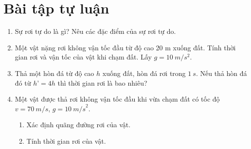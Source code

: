 \section{Bài tập tự luận}
\begin{enumerate}[label=\bfseries Bài \arabic*:,leftmargin=1.5cm]
	\item {}
	
	{
		Sự rơi tự do là gì? Nêu các đặc điểm của sự rơi tự do.
	}
	

\item {}

{Một vật nặng rơi không vận tốc đầu từ độ cao 20 m xuống đất. Tính thời gian rơi và vận tốc của vật khi chạm đất. Lấy $g=\SI{10}{m/s^2}$.}

\item {}
{
	
	Thả một hòn đá từ độ cao $h$ xuống đất, hòn đá rơi trong $\SI{1}{s}$. Nếu thả hòn đá đó từ $h’ = 4h$ thì thời gian rơi là bao nhiêu?
}


	\item {}
	
	{
		Một vật được thả rơi không vận tốc đầu khi vừa chạm đất có tốc độ $v=\SI{70}{m/s}$, $g = \SI{10}{m/s}^2$.
		\begin{enumerate}[label=\alph*)]
			\item Xác định quãng đường rơi của vật.
			\item Tính thời gian rơi của vật.
		\end{enumerate}
	}
	

\end{enumerate}
